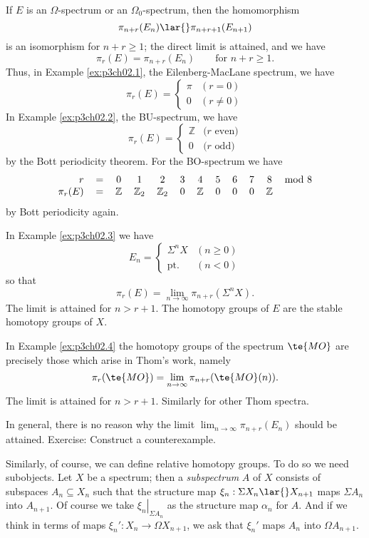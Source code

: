 \documentclass[../main]{subfiles}
\begin{document}
If $E$ is an $\Omega$-spectrum or an $\Omega_0$-spectrum, then the homomorphism
\[
\pi_{n+r}(E_n)
\lar{}
\pi_{n+r+1}(E_{n+1})
\]
is an isomorphism for $n+r\geq 1$; the direct limit is attained, and we have
\[
\pi_r(E)=\pi_{n+r}(E_n)
\qquad
\text{for $n+r\geq 1$.}
\]
Thus, in Example \ref{ex:p3ch02.1}, the Eilenberg-MacLane spectrum, we have
\[
\pi_r(E)
=
\begin{cases}
\pi &(r=0) \\
  0 &(r\neq 0)
\end{cases}
\]
In Example \ref{ex:p3ch02.2}, the BU-spectrum, we have
\[
\pi_r(E)
=
\begin{cases}
\mathbb Z &\text{($r$ even)} \\
  0 &\text{($r$ odd)}
\end{cases}
\]
by the Bott periodicity theorem. For the BO-spectrum we have
\[
\begin{tabular}{rccccccccccc}
$r$ & = & 
0&1&2&3&4&5&6&7&8&mod 8 \\
$\pi_r(E)$ & = &
$\mathbb Z$ & $\mathbb Z_2$ & $\mathbb Z_2$ & 0 & $\mathbb Z$ & 0 & 0 & 0 & $\mathbb Z$ &
\end{tabular}
\]
by Bott periodicity again.

In Example \ref{ex:p3ch02.3} we have
\[
E_n
=
\begin{cases}
\Sigma  ^nX         &(n\geq 0) \\
\mathrm{pt.} &(n<0)
\end{cases}
\]
so that
\[
\pi_r(E) = \lim_{n\to \infty} \pi_{n+r}(\Sigma  ^nX).
\]
The limit is attained for $n>r+1$. The homotopy groups of $E$ are the stable homotopy groups of $X$.

In Example \ref{ex:p3ch02.4} the homotopy groups of the spectrum $\te{MO}$ are precisely those which arise in Thom's work, namely
\[
\pi_r(\te{MO}) = \lim_{n\to \infty} \pi_{n+r}(\te{MO}(n)).
\]
The limit is attained for $n>r+1$. Similarly for other Thom spectra.

In general, there is no reason why the limit $\displaystyle \lim_{n\to \infty} \pi_{n+r}(E_n)$ should be attained. Exercise: Construct a counterexample.

Similarly, of course, we can define relative homotopy groups. To do so we need subobjects. Let $X$ be a spectrum; then a \emph{subspectrum} $A$ of $X$ consists of subspaces $A_n\subseteq X_n$ such that the structure map $\xi_n: \Sigma   X_n \lar{} X_{n+1}$ maps $\Sigma   A_n$ into $A_{n+1}$. Of course we take $\left. \xi_n \right\rvert_{\Sigma A_n}$ as the structure map $\alpha_n$ for $A$. And if we think in terms of maps $\xi_n': X_n\to\Omega X_{n+1}$, we ask that $\xi_n'$ maps $A_n$ into $\Omega A_{n+1}$.
\end{document}

